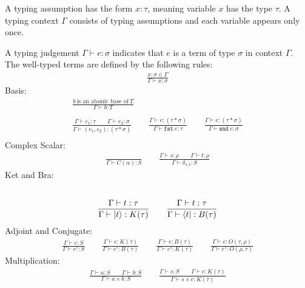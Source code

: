 \documentclass[manuscript, review, timestamp]{acmart}
\newcommand*{\fst}{\texttt{fst}}
\newcommand*{\snd}{\texttt{snd}}
\begin{document}
\begin{definition}
  A typing assumption has the form $x : \tau$, meaning variable $x$ has the type $\tau$. A typing context $\Gamma$ consists of typing assumptions and each variable appears only once.

  A typing judgement $\Gamma \vdash e : \sigma$ indicates that $e$ is a term of type $\sigma$ in context $\Gamma$. The well-typed terms are defined by the following rules:
  \begin{gather*}
    \frac{x : \sigma \in \Gamma}{\Gamma \vdash x : \sigma}
  \end{gather*}
  Basis:
  \begin{gather*}
    \frac{b\ \textrm{is an atomic base of}\ T}{\Gamma \vdash b : T}\\
    \\
    \frac{\Gamma \vdash e_1 : \tau \qquad \Gamma \vdash e_2 : \sigma}{\Gamma \vdash (e_1, e_2) : ( \tau * \sigma )}
    \qquad
    \frac{\Gamma \vdash e : ( \tau * \sigma ) }{\Gamma \vdash \fst\ e : \tau}
    \qquad
    \frac{\Gamma \vdash e : ( \tau * \sigma ) }{\Gamma \vdash \snd\ e : \sigma} \\
  \end{gather*}
  Complex Scalar:
  \begin{gather*}
    \frac{}{\Gamma \vdash C(\alpha) : S}
    \qquad
    \frac{\Gamma \vdash s : \rho \qquad \Gamma \vdash t : \rho}{\Gamma \vdash \delta_{s, t} : S}
  \end{gather*}
  Ket and Bra:
  \begin{gather*}
    \\
    \frac{\Gamma \vdash t : \tau}{\Gamma \vdash \ket{t} : K(\tau)}
    \qquad 
    \frac{\Gamma \vdash t : \tau}{\Gamma \vdash \bra{t} : B(\tau)}
  \end{gather*}
  Adjoint and Conjugate:
  \begin{gather*}
    \frac{\Gamma \vdash e : S}{\Gamma \vdash e^\dagger : S}
    \qquad
    \frac{\Gamma \vdash e : K(\tau)}{\Gamma \vdash e^\dagger : B(\tau)}
    \qquad
    \frac{\Gamma \vdash e : B(\tau)}{\Gamma \vdash e^\dagger : K(\tau)}
    \qquad
    \frac{\Gamma \vdash e : O(\tau, \rho)}{\Gamma \vdash e^\dagger : O(\rho, \tau)} 
  \end{gather*}
  Multiplication:
  \begin{gather*}
    \frac{\Gamma \vdash a : S \qquad \Gamma \vdash b : S}{\Gamma \vdash a \times b : S}
    \qquad
    \frac{\Gamma \vdash s : S \qquad \Gamma \vdash e : K(\tau)}{\Gamma \vdash s \times e : K(\tau)} 

\end{gather*}
\end{definition}
\end{document}
